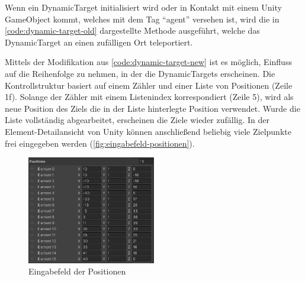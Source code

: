 Wenn ein DynamicTarget initialisiert wird oder in Kontakt mit einem Unity GameObject kommt, welches mit dem Tag \enquote{agent} versehen ist, wird die in \autoref{code:dynamic-target-old} dargestellte Methode ausgeführt, welche das DynamicTarget an einen zufälligen Ort teleportiert.

\begin{figure}
    
\end{figure}

Mittels der Modifikation aus \autoref{code:dynamic-target-new} ist es möglich, Einfluss auf die Reihenfolge zu nehmen, in der die DynamicTargets erscheinen.
Die Kontrollstruktur basiert auf einem Zähler und einer Liste von Positionen (Zeile 1f).
Solange der Zähler mit einem Listenindex korrespondiert (Zeile 5), wird als neue Position des Ziels die in der Liste hinterlegte Position verwendet.
Wurde die Liste vollständig abgearbeitet, erscheinen die Ziele wieder zufällig.
In der Element-Detailansicht von Unity können anschließend beliebig viele Zielpunkte frei eingegeben werden (\autoref{fig:eingabefeld-positionen}).

\begin{figure}
    
\end{figure}

\begin{figure}
    \centering
    \includegraphics[width = 0.5\textwidth]{Bilder/crawler/position-list.png}
    \caption{Eingabefeld der Positionen}
    \label{fig:eingabefeld-positionen}
\end{figure}

